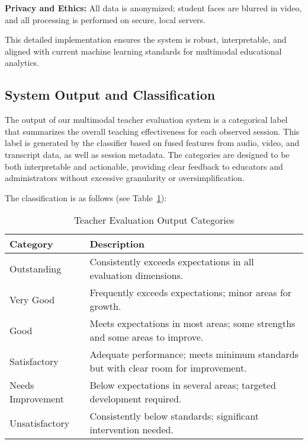\textbf{Privacy and Ethics:}  
All data is anonymized; student faces are blurred in video, and all processing is performed on secure, local servers.

This detailed implementation ensures the system is robust, interpretable, and aligned with current machine learning standards for multimodal educational analytics.

\subsection{System Output and Classification}

The output of our multimodal teacher evaluation system is a categorical label that summarizes the overall teaching effectiveness for each observed session. This label is generated by the classifier based on fused features from audio, video, and transcript data, as well as session metadata. The categories are designed to be both interpretable and actionable, providing clear feedback to educators and administrators without excessive granularity or oversimplification.

The classification is as follows (see Table~\ref{tab:output_categories}):

\begin{table}[H]
    \centering
    \normalsize
    \caption{Teacher Evaluation Output Categories}
    \label{tab:output_categories}
    \begin{tabular}{p{2.2cm} p{7.1cm}}
        \toprule
        \textbf{Category} & \textbf{Description} \\
        \midrule
        Outstanding & Consistently exceeds expectations in all evaluation dimensions. \\
        Very Good & Frequently exceeds expectations; minor areas for growth. \\
        Good & Meets expectations in most areas; some strengths and some areas to improve. \\
        Satisfactory & Adequate performance; meets minimum standards but with clear room for improvement. \\
        Needs Improvement & Below expectations in several areas; targeted development required. \\
        Unsatisfactory & Consistently below standards; significant intervention needed. \\
        \bottomrule
    \end{tabular}
\end{table}

